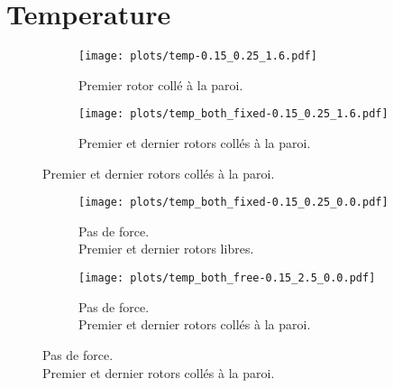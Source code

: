 \section{Temperature}


\begin{figure}[H]
    \centering
    \begin{subfigure}{.5\textwidth}
        \centering
        \texttt{[image: plots/temp-0.15\_0.25\_1.6.pdf]}
        \caption{Premier rotor collé à la paroi.}
    \end{subfigure}%
    \begin{subfigure}{.5\textwidth}
        \centering
        \texttt{[image: plots/temp\_both\_fixed-0.15\_0.25\_1.6.pdf]}
        \caption{Premier et dernier rotors collés à la paroi.}
    \end{subfigure}
\end{figure}


\begin{figure}[H]
    \centering
    \begin{subfigure}{.5\textwidth}
        \centering
        \texttt{[image: plots/temp\_both\_fixed-0.15\_0.25\_0.0.pdf]}
        \caption{Pas de force. \\ Premier et dernier rotors libres.}
    \end{subfigure}%
    \begin{subfigure}{.5\textwidth}
        \centering
        \texttt{[image: plots/temp\_both\_free-0.15\_2.5\_0.0.pdf]}
        \caption{Pas de force. \\ Premier et dernier rotors collés à la paroi.}
    \end{subfigure}
\end{figure}


